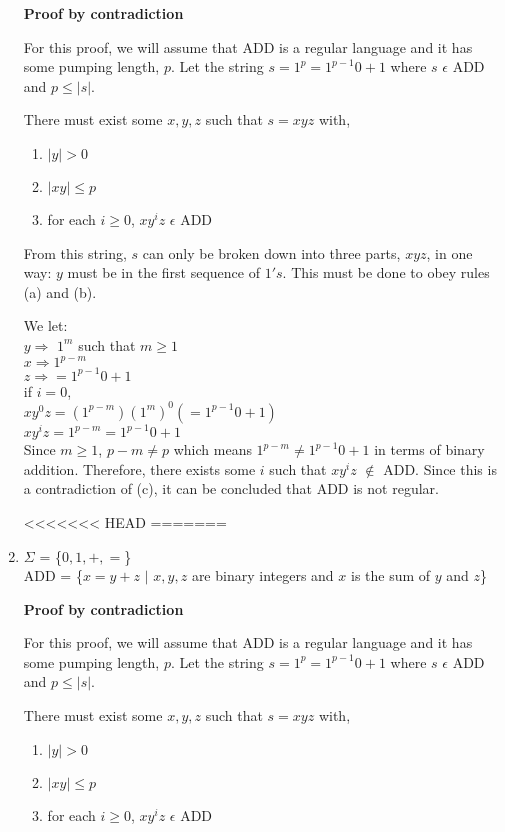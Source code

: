 \documentclass[a4paper, 12pt]{article}
\begin{document}
\begin{enumerate}
\textbf{Proof by contradiction}

For this proof, we will assume that ADD is a regular language and it has some pumping length, $p$. Let the string $s = 1^p =1^{p-1} 0 + 1$ where $s$ $\epsilon$ ADD and $p \leq |s|$. 

There must exist some $x,y,z$ such that $s = xyz$ with,
\begin{enumerate}
\item $|y| > 0$
\item $|xy| \leq p$
\item for each $i \geq 0$, $xy^iz$ $\epsilon$ ADD
\end{enumerate}

From this string, $s$ can only be broken down into three parts, $xyz$, in one way: $y$ must be in the first sequence of $1's$. This must be done to obey rules (a) and (b). 

We let:\\
$y \Rightarrow $ $1^m$ such that $m \geq 1$ \\
$x \Rightarrow 1^{p-m}$\\
$z \Rightarrow  =1^{p-1} 0 + 1$\\

if $i = 0$,\\
$xy^0z = (1^{p-m}) (1^m)^0 (=1^{p-1} 0 + 1)$\\
$xy^iz = 1^{p-m} = 1^{p-1} 0 + 1$\\

Since $m \geq 1$, $p-m \ne p$ which means $1^{p-m} \ne 1^{p-1} 0 + 1$ in terms of binary addition.
Therefore, there exists some $i$ such that $xy^iz$ $\notin$ ADD. 
Since this is a contradiction of (c),  it can be concluded that ADD is not regular. 




<<<<<<< HEAD
=======
\item %
$\Sigma$ = \{$0, 1, +, =$\}\\
ADD = \{$x = y + z$ $\mid$ $x,y,z$ are binary integers and $x$ is the sum of $y$ and $z$\}

\textbf{Proof by contradiction}

For this proof, we will assume that ADD is a regular language and it has some pumping length, $p$. Let the string $s = 1^p =1^{p-1} 0 + 1$ where $s$ $\epsilon$ ADD and $p \leq |s|$. 

There must exist some $x,y,z$ such that $s = xyz$ with,
\begin{enumerate}
\item $|y| > 0$
\item $|xy| \leq p$
\item for each $i \geq 0$, $xy^iz$ $\epsilon$ ADD
\end{enumerate}


\end{enumerate}
\end{document}
